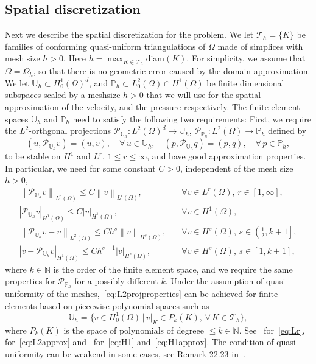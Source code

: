 \documentclass[10pt,letterpaper]{amsart}
\newcommand{\N}{\mathbb{N}}
\newcommand\norm[1]{\left\lVert#1\right\rVert}
\newcommand{\dom}{\Omega}
\newcommand{\Ph}{\mathbb{P}_h}
\newcommand{\Uh}{\mathbb{U}_h}
\newcommand{\PUh}{\mathcal{P}_{\Uh}}
\newcommand{\PPh}{\mathcal{P}_{\Ph}}
\theoremstyle{definition}{\newtheorem{definition}[lemma]{Definition}}
\numberwithin{equation}{section}
\begin{document}
\subsection{Spatial discretization}\label{sec:spatial}
Next we describe the spatial discretization for the problem. 
We let $\mathcal{T}_h=\{K\}$ be families of conforming quasi-uniform triangulations of $\dom$ made of simplices with mesh size $h>0$. Here $h=\max_{K\in \mathcal{T}_h}\text{diam}(K)$. For simplicity, we assume that $\dom=\dom_h$, so that there is no geometric error caused by the domain approximation. We let $\Uh\subset H^1_0(\dom)^d$, and $\Ph\subset L^2_0(\dom)\cap H^1(\dom)$  be finite dimensional subspaces scaled by a meshsize $h>0$ that we will use for the spatial approximation of the velocity, and the pressure  respectively.  
The finite element spaces $\Uh$ and $\Ph$ need to satisfy the following two requirements: First, we require the $L^2$-orthgonal projections 
$\PUh:L^2(\dom)^d\to \Uh$, $\PPh:L^2(\dom)\to \Ph$ defined by
\begin{equation}\label{eq:L2projection}
	(u,\PUh v) = (u,v),\quad \forall \, u\in \Uh, \quad 	(p,\PUh q) = (p,q),\quad \forall \, p\in \Ph,
\end{equation}
to be stable on $H^1$ and $L^r$, $1\leq r\leq \infty$, and have  good approximation properties. In particular, we need for some constant $C>0$, independent of the mesh size $h>0$,
\begin{subequations}
	\label{eq:L2projproperties}
	\begin{align}
		\norm{\PUh v}_{L^r(\dom)}\leq C\norm{v}_{L^r(\dom)},&\quad \forall v \in L^r(\dom),\, r\in [1,\infty],\label{eq:Lr}\\
		\left|\PUh v\right|_{H^1(\dom)}\leq C\left|v\right|_{H^1(\dom)},&\quad \forall v\in H^1(\dom),\label{eq:H1}\\
		\norm{\PUh v - v}_{L^2(\dom)}\leq C h^s \norm{v}_{H^s(\dom)},&\quad \forall v\in H^s(\dom),\, s\in \left(\frac12,k+1\right],\label{eq:L2approx}\\
			\left|v-\PUh v\right|_{H^1(\dom)}\leq C h^{s-1} |v|_{H^s(\dom)},&\quad \forall v\in H^s(\dom),\, s\in [1,k+1],\label{eq:H1approx}
	\end{align}
\end{subequations}
where $k\in \N$ is the order of the finite element space, and we require the same properties for $\PPh$ for a possibly different $k$. Under the assumption of quasi-uniformity of the meshes,~\eqref{eq:L2projproperties} can be achieved for finite elements based on piecewise polynomial spaces such as
\begin{equation*}
	\Uh = \{v\in H^1_0(\dom)\, | \, \left.v\right|_K\in P_k(K),\, \forall \, K\in \mathcal{T}_h \},
\end{equation*}
where $P_k(K)$ is the space of polynomials of degreee $\leq k\in \N$.  See~\cite{Douglas1975} for~\eqref{eq:Lr},~\cite[Prop 22.19]{Ern2021} for~\eqref{eq:L2approx} and~\cite[Prop. 22.21]{Ern2021} for~\eqref{eq:H1} and~\eqref{eq:H1approx}. The condition of quasi-uniformity can be weakend in some cases, see Remark 22.23 in~\cite{Ern2021}.
\end{document}
